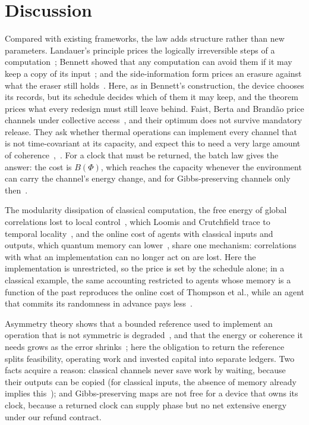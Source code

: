 \documentclass[11pt]{article}
\theoremstyle{definition}
\theoremstyle{remark}
\begin{document}
\section{Discussion}\label{sec:discussion}

Compared with existing frameworks, the law adds structure rather than new parameters. Landauer's principle prices the logically irreversible steps of a computation~\cite{Landauer61}; Bennett showed that any computation can avoid them if it may keep a copy of its input~\cite{Bennett73}; and the side-information form prices an erasure against what the eraser still holds~\cite{delRio11}. Here, as in Bennett's construction, the device chooses its records, but its schedule decides which of them it may keep, and the theorem prices what every redesign must still leave behind. Faist, Berta and Brand\~ao price channels under collective access~\cite{FBB19,FBB21}, and their optimum does not survive mandatory release. They ask whether thermal operations can implement every channel that is not time-covariant at its capacity, and expect this to need a very large amount of coherence~\cite{FBB19},~\cite[Sec.~9]{FBB21}. For a clock that must be returned, the batch law gives the answer: the cost is $B(\Phi)$, which reaches the capacity whenever the environment can carry the channel's energy change, and for Gibbs-preserving channels only then~\cite{KeepingTime}.

The modularity dissipation of classical computation, the free energy of global correlations lost to local control~\cite{BMC18}, which Loomis and Crutchfield trace to temporal locality~\cite{LoomisCrutchfield20}, and the online cost of agents with classical inputs and outputs, which quantum memory can lower~\cite{Thompson25}, share one mechanism: correlations with what an implementation can no longer act on are lost. Here the implementation is unrestricted, so the price is set by the schedule alone; in a classical example, the same accounting restricted to agents whose memory is a function of the past reproduces the online cost of Thompson et al., while an agent that commits its randomness in advance pays less~\cite{Answering}.

Asymmetry theory shows that a bounded reference used to implement an operation that is not symmetric is degraded~\cite{MarvianSpekkens19,LostaglioMuller19}, and that the energy or coherence it needs grows as the error shrinks~\cite{ChiribellaYangRenner21,TSS20}; here the obligation to return the reference splits feasibility, operating work and invested capital into separate ledgers. Two facts acquire a reason: classical channels never save work by waiting, because their outputs can be copied (for classical inputs, the absence of memory already implies this~\cite{Thompson25}); and Gibbs-preserving maps are not free for a device that owns its clock, because a returned clock can supply phase but no net extensive energy under our refund contract.
\end{document}
